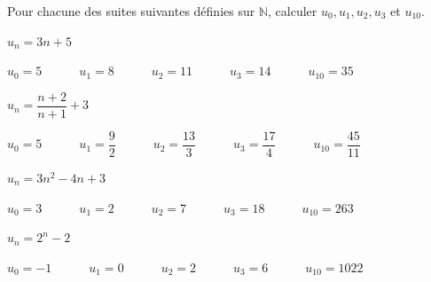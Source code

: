 \documentclass[12pt,a4paper]{article}  %
\begin{document}
Pour chacune des suites suivantes définies sur $\mathbb{N}$, calculer $u_{0}, u_{1}, u_{2}, u_{3}$ et $u_{10}$.
\begin{enumMet}
    \item {} $u_{n}=3 n+5$\\
    \begin{corrBox}
        $u_0=5\quad\quad\quad u_1=8\quad\quad\quad u_2=11\quad\quad\quad u_3=14\quad\quad\quad u_{10}=35$
    \end{corrBox}
    \item $u_{n}=\dfrac{n+2}{n+1}+3$\\
    \begin{corrBox}
        $u_0=5\quad\quad\quad u_1=\dfrac{9}{2}\quad\quad\quad u_2=\dfrac{13}{3}\quad\quad\quad u_3=\dfrac{17}{4}\quad\quad\quad u_{10}=\dfrac{45}{11}$
    \end{corrBox}
    \item $u_{n}=3n^{2}-4 n+3$\\
    \begin{corrBox}
        $u_0=3\quad\quad\quad u_1=2\quad\quad\quad u_2=7\quad\quad\quad u_3=18\quad\quad\quad u_{10}=263$
    \end{corrBox}
    \item $u_{n}=2^{n}-2$\\
    \begin{corrBox}
        $u_0=-1\quad\quad\quad u_1=0\quad\quad\quad u_2=2\quad\quad\quad u_3=6\quad\quad\quad u_{10}=1022$
    \end{corrBox}
\end{enumMet}
\end{document}
